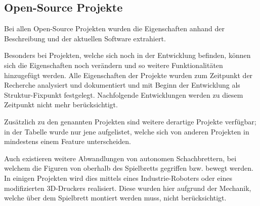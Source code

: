 \hypertarget{open-source-projekte}{%
\subsection{Open-Source Projekte}\label{open-source-projekte}}

Bei allen Open-Source Projekten wurden die Eigenschaften anhand der
Beschreibung und der aktuellen Software extrahiert.

Besonders bei Projekten, welche sich noch in der Entwicklung befinden,
können sich die Eigenschaften noch verändern und so weitere
Funktionalitäten hinzugefügt werden. Alle Eigenschaften der Projekte
wurden zum Zeitpunkt der Recherche analysiert und dokumentiert und mit
Beginn der Entwicklung als Struktur-Fixpunkt festgelegt. Nachfolgende
Entwicklungen werden zu diesem Zeitpunkt nicht mehr berücksichtigt.

Zusätzlich zu den genannten Projekten sind weitere derartige Projekte
verfügbar; in der Tabelle wurde nur jene aufgelistet, welche sich von
anderen Projekten in mindestens einem Feature unterscheiden.

Auch existieren weitere Abwandlungen von autonomen Schachbrettern, bei
welchem die Figuren von oberhalb des Spielbretts gegriffen bzw. bewegt
werden. In einigen Projekten wird dies mittels eines Industrie-Roboters
\cite{actprojectrobot} oder eines modifizierten
3D-Druckers\cite{atcproject3dprinter} realisiert. Diese wurden hier
aufgrund der Mechanik, welche über dem Spielbrett montiert werden muss,
nicht berücksichtigt.

